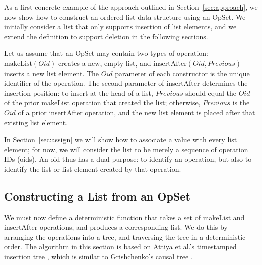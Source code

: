 As a first concrete example of the approach outlined in Section~\ref{sec:approach}, we now show how to construct an ordered list data structure using an OpSet.
We initially consider a list that only supports insertion of list elements, and we extend the definition to support deletion in the following sections.

Let us assume that an OpSet may contain two types of operation:
$\mathrm{makeList}(\mathit{Oid})$ creates a new, empty list, and
$\mathrm{insertAfter}(\mathit{Oid}, \mathit{Previous})$ inserts a new list element.
The $\mathit{Oid}$ parameter of each constructor is the unique identifier of the operation.
The second parameter of insertAfter determines the insertion position: to insert at the head of a list, $\mathit{Previous}$ should equal the $\mathit{Oid}$ of the prior makeList operation that created the list; otherwise, $\mathit{Previous}$ is the $\mathit{Oid}$ of a prior insertAfter operation, and the new list element is placed after that existing list element.

In Section~\ref{sec:assign} we will show how to associate a value with every list element; for now, we will consider the list to be merely a sequence of operation IDs (oids).
An oid thus has a dual purpose: to identify an operation, but also to identify the list or list element created by that operation.

\subsection{Constructing a List from an OpSet}

We must now define a deterministic function that takes a set of makeList and insertAfter operations, and produces a corresponding list.
We do this by arranging the operations into a tree, and traversing the tree in a deterministic order.
The algorithm in this section is based on Attiya et al.'s timestamped insertion tree \cite{Attiya:2016kh}, which is similar to Grishchenko's causal tree \cite{Grishchenko:2014eh}.

